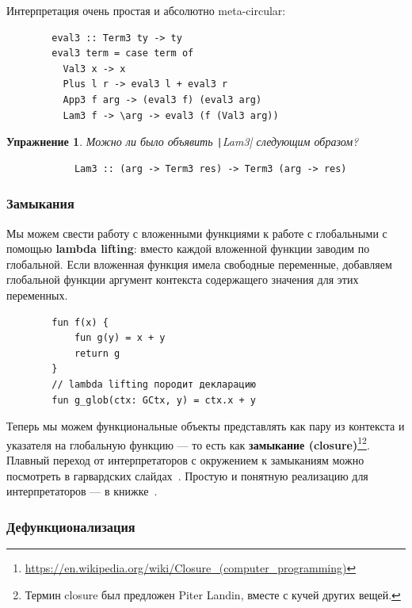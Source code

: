 \documentclass[12pt]{article}
\newcommand{\vocab}[1]{\textbf{#1}} %
\newtheorem{task}{Упражнение}
\begin{document}
    Интерпретация очень простая и абсолютно meta-circular:
    \begin{verbatim}
        eval3 :: Term3 ty -> ty
        eval3 term = case term of
          Val3 x -> x
          Plus l r -> eval3 l + eval3 r
          App3 f arg -> (eval3 f) (eval3 arg)
          Lam3 f -> \arg -> eval3 (f (Val3 arg))
    \end{verbatim}

    \begin{task}
        Можно ли было объявить \texttt|Lam3| следующим образом?
        \begin{verbatim}
            Lam3 :: (arg -> Term3 res) -> Term3 (arg -> res)
        \end{verbatim}
    \end{task}

    \subsubsection{Замыкания} \label{subsubsec:closures}

    Мы можем свести работу с вложенными функциями к работе с глобальными с помощью \vocab{lambda lifting}: вместо каждой вложенной функции заводим по глобальной.
    Если вложенная функция имела свободные переменные, добавляем глобальной функции аргумент контекста содержащего значения для этих переменных.
    \begin{verbatim}
        fun f(x) {
            fun g(y) = x + y
            return g
        }
        // lambda lifting породит декларацию
        fun g_glob(ctx: GCtx, y) = ctx.x + y
    \end{verbatim}

    Теперь мы можем функциональные объекты представлять как пару из контекста и указателя на глобальную функцию --- то есть как \vocab{замыкание (closure)}\footnote{\url{https://en.wikipedia.org/wiki/Closure_(computer_programming)}}\footnote{Термин closure был предложен Piter Landin, вместе с кучей других вещей.}.
    Плавный переход от интерпретаторов с окружением к замыканиям можно посмотреть в гарвардских слайдах~\cite{closures-slides}.
    Простую и понятную реализацию для интерпретаторов --- в книжке~\cite[глава 11]{nystrom2021crafting}.

    \subsubsection{Дефункционализация} \label{subsubsec:defunctionalization}
\end{document}
